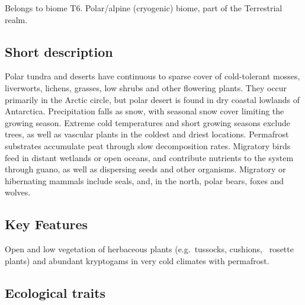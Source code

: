 \documentclass[
  letterpaper,
  DIV=11,
  numbers=noendperiod]{scrartcl}
\begin{document}
Belongs to biome T6. Polar/alpine (cryogenic) biome, part of the
Terrestrial realm.

\subsection{Short description}\label{short-description-95}

Polar tundra and deserts have continuous to sparse cover of
cold-tolerant mosses, liverworts, lichens, grasses, low shrubs and other
flowering plants. They occur primarily in the Arctic circle, but polar
desert is found in dry coastal lowlands of Antarctica. Precipitation
falls as snow, with seasonal snow cover limiting the growing season.
Extreme cold temperatures and short growing seasons exclude trees, as
well as vascular plants in the coldest and driest locations. Permafrost
substrates accumulate peat through slow decomposition rates. Migratory
birds feed in distant wetlands or open oceans, and contribute nutrients
to the system through guano, as well as dispersing seeds and other
organisms. Migratory or hibernating mammals include seals, and, in the
north, polar bears, foxes and wolves.

\subsection{Key Features}\label{key-features-95}

Open and low vegetation of herbaceous plants (e.g.~tussocks, cushions,~
rosette plants) and abundant kryptogams in very cold climates with
permafrost.

\subsection{Ecological traits}\label{ecological-traits-95}
\end{document}
